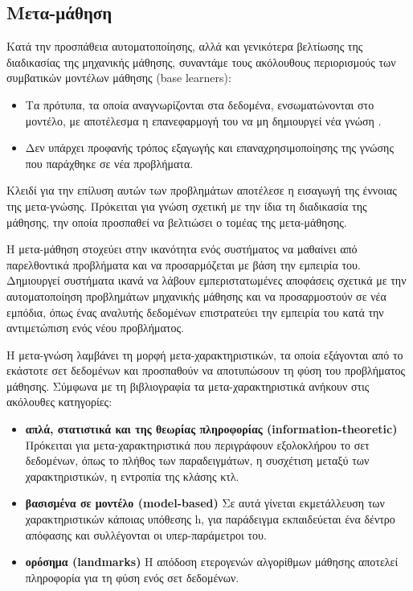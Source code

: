  \subsection{Μετα-μάθηση}
 Κατά την προσπάθεια αυτοματοποίησης, αλλά και γενικότερα βελτίωσης της διαδικασίας της μηχανικής μάθησης, συναντάμε τους ακόλουθους περιορισμούς των συμβατικών μοντέλων μάθησης (base learners):
 
 \begin{itemize}
 	\item Τα πρότυπα, τα οποία αναγνωρίζονται στα δεδομένα, ενσωματώνονται στο μοντέλο, με αποτέλεσμα η επανεφαρμογή του να μη δημιουργεί νέα γνώση \citep{Brazdil2009}.
 	\item Δεν υπάρχει προφανής  τρόπος εξαγωγής και επαναχρησιμοποίησης της γνώσης που παράχθηκε σε νέα προβλήματα. 	
 \end{itemize}
 
 Κλειδί για την επίλυση αυτών των προβλημάτων αποτέλεσε η εισαγωγή της έννοιας της μετα-γνώσης. Πρόκειται για γνώση σχετική με την ίδια τη διαδικασία της μάθησης, την οποία προσπαθεί να βελτιώσει ο τομέας της μετα-μάθησης.
 
 Η μετα-μάθηση στοχεύει στην ικανότητα ενός συστήματος να μαθαίνει από παρελθοντικά προβλήματα και να προσαρμόζεται με βάση την εμπειρία του. Δημιουργεί συστήματα ικανά να λάβουν εμπεριστατωμένες αποφάσεις σχετικά με την αυτοματοποίηση προβλημάτων μηχανικής μάθησης και να προσαρμοστούν σε νέα εμπόδια, όπως ένας αναλυτής δεδομένων επιστρατεύει την εμπειρία του κατά την αντιμετώπιση ενός νέου προβλήματος. 
 
 Η μετα-γνώση λαμβάνει τη μορφή μετα-χαρακτηριστικών, τα οποία εξάγονται από το εκάστοτε σετ δεδομένων και προσπαθούν να αποτυπώσουν τη φύση του προβλήματος μάθησης. Σύμφωνα με τη βιβλιογραφία \citep{Brazdil2009} τα μετα-χαρακτηριστικά ανήκουν στις ακόλουθες κατηγορίες:
 \begin{itemize}
 	\item \textbf{απλά, στατιστικά και της θεωρίας πληροφορίας (information-theoretic)} Πρόκειται για μετα-χαρακτηριστικά που περιγράφουν εξολοκλήρου το σετ δεδομένων, όπως το πλήθος των παραδειγμάτων, η συσχέτιση μεταξύ των χαρακτηριστικών, η εντροπία της κλάσης κτλ.
 	\item \textbf{βασισμένα σε μοντέλο (model-based)} Σε αυτά γίνεται εκμετάλλευση των χαρακτηριστικών κάποιας υπόθεσης h, για παράδειγμα εκπαιδεύεται ένα δέντρο απόφασης και συλλέγονται οι υπερ-παράμετροι του.
 	\item \textbf{ορόσημα (landmarks)} H απόδοση ετερογενών αλγορίθμων μάθησης αποτελεί πληροφορία για τη φύση ενός σετ δεδομένων. 
 \end{itemize}
 
